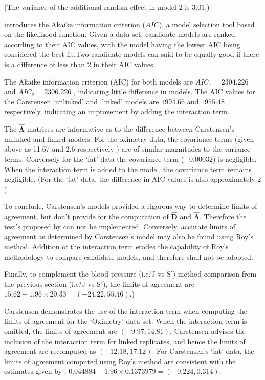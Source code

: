 \documentclass[12pt, a4paper]{report}
\theoremstyle{plain}
\theoremstyle{definition}
\theoremstyle{remark}
\begin{document}
		\noindent (The variance of the additional random effect in model $2$ is $3.01$.)
		
		\citet{akaike} introduces the Akaike information criterion ($AIC$), a model
		selection tool based on the likelihood function. Given a data set, candidate models
		are ranked according to their AIC values, with the model having the lowest AIC being considered the best fit.Two candidate models can said to be equally good if there is a difference of less than $2$ in their AIC values.
		
		The Akaike information criterion (AIC) for both models are $AIC_{1} = 2304.226$ and $AIC_{2} = 2306.226$ , indicating little difference in models. The AIC values for the Carstensen `unlinked' and `linked' models are $1994.66$ and $1955.48$ respectively, indicating an improvement by adding the interaction term.
		
		The $\boldsymbol{\hat{\Lambda}}$ matrices are informative as to the difference between Carstensen's unlinked and linked models. For the oximetry data, the covariance terms (given above as 11.67 and 2.6 respectively ) are of similar magnitudes to the variance terms. Conversely for the `fat' data the covariance term ($-0.00032$) is negligible. When the interaction term is added to the model, the covariance term remains negligible. (For the `fat' data, the difference in AIC values is also approximately $2$).
		
		To conclude, Carstensen's models provided a rigorous way to determine limits of agreement, but don't provide for the computation of $\boldsymbol{\hat{D}}$ and $\boldsymbol{\hat{\Lambda}}$. Therefore the test's proposed by \citet{ARoy2009} can not be implemented. Conversely, accurate limits of agreement as determined by Carstensen's model may also be found using Roy's method. Addition of the interaction term erodes the capability of Roy's methodology to compare candidate models, and therefore shall not be adopted.
		
		Finally, to complement the blood pressure (i.e.`J vs S') method comparison from the previous section (i.e.`J vs S'), the limits of agreement are $15.62 \pm 1.96 \times 20.33 = (-24.22, 55.46)$.)
		\newpage
		
	Carstensen demonstrates the use of the interaction term when computing the limits of agreement for the `Oximetry' data set. When the interaction term is omitted, the limits of agreement are $(-9.97, 14.81)$. Carstensen advises the inclusion of the interaction term for linked replicates, and hence the limits of agreement are recomputed as $(-12.18,17.12)$.
	\newpage
	For Carstensen's `fat' data, the limits of agreement computed using Roy's
	method are consistent with the estimates given by \citet{BXC2008}; $0.044884  \pm 1.96 \times  0.1373979 = (-0.224,  0.314).$
	
\end{document}
